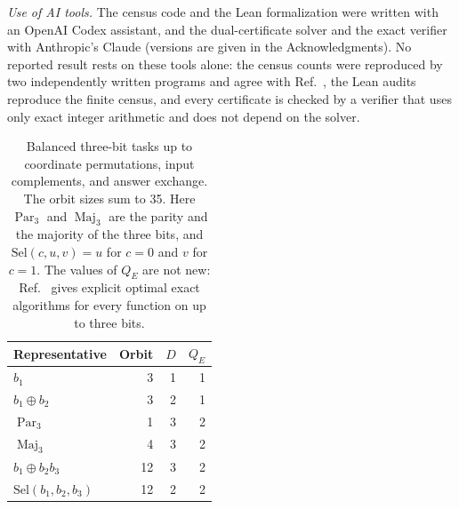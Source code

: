 \documentclass[
  aps,
  pra,
  reprint,
  nofootinbib
]{revtex4-2}
\begin{document}
\emph{Use of AI tools.} The census code and the Lean formalization were
written with an OpenAI Codex assistant, and the dual-certificate solver and
the exact verifier with Anthropic's Claude (versions are given in the
Acknowledgments). No
reported result rests on these tools alone: the census counts were reproduced
by two independently written programs and agree with
Ref.~\cite{MontanaroJozsaMitchison2015}, the Lean audits reproduce the finite
census, and every certificate is checked by a verifier that uses only exact
integer arithmetic and does not depend on the solver.

\begin{table}[t]
\caption{Balanced three-bit tasks up to coordinate permutations, input
complements, and answer exchange. The orbit sizes sum to 35. Here
\(\operatorname{Par}_3\) and \(\operatorname{Maj}_3\) are the parity and the
majority of the three bits, and \(\mathrm{Sel}(c,u,v)=u\) for \(c=0\) and \(v\)
for \(c=1\). The values of
\(Q_E\) are not new: Ref.~\cite{MontanaroJozsaMitchison2015} gives explicit
optimal exact algorithms for every function on up to three bits.}
\label{tab:n3}
\begin{ruledtabular}
\begin{tabular}{lrrr}
Representative & Orbit & \(D\) & \(Q_E\)\\
\hline
\(b_1\) & 3 & 1 & 1\\
\(b_1\mathbin\oplus b_2\) & 3 & 2 & 1\\
\(\operatorname{Par}_3\) & 1 & 3 & 2\\
\(\operatorname{Maj}_3\) & 4 & 3 & 2\\
\(b_1\mathbin\oplus b_2b_3\) & 12 & 3 & 2\\
\(\mathrm{Sel}(b_1,b_2,b_3)\) & 12 & 2 & 2\\
\end{tabular}
\end{ruledtabular}
\end{table}
\end{document}
